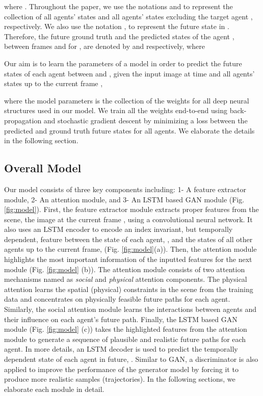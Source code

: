 \documentclass[10pt,twocolumn,letterpaper]{article}
\begin{document}
where . Throughout the paper, we use the notations  and  to represent the collection of all  agents' states and all agents' states excluding the target agent , respectively. We also use the notation , to represent the future state in . Therefore, the future ground truth and the predicted states of the agent , between frames  and  for , are denoted by  and  respectively, where 

Our aim is to learn the parameters of a model  in order to predict the future states of each agent between  and , given the input image at time  and all agents' states up to the current frame , \ie 

where the model parameters  is the collection of the weights for all deep neural structures used in our model. We train all the weights end-to-end using back-propagation and stochastic gradient descent by minimizing a loss  between the predicted and ground truth future states for all agents. We elaborate the details in the following section.


\subsection{Overall Model}
\label{sec:Overall_Model}
Our model consists of three key components including: 1- A feature extractor module, 2- An attention module, and 3- An LSTM based GAN module (Fig. \ref{fig:model}). First, the feature extractor module extracts proper features from the scene, \ie the image at the current frame , using a convolutional neural network. It also uses an LSTM encoder to encode an index invariant, but temporally dependent, feature between the state of each agent, , and the states of all other agents up to the current frame,  (Fig. \ref{fig:model}(a)). Then, the attention module highlights the most important information of the inputted features for the next module (Fig. \ref{fig:model} (b)). The attention module consists of two attention mechanisms named as \emph{social} and \emph{physical} attention components. The physical attention learns the spatial (physical) constraints in the scene from the training data and concentrates on physically feasible future paths for each agent. Similarly, the social attention module learns the interactions between agents and their influence on each agent's future path. Finally, the LSTM based GAN module (Fig. \ref{fig:model} (c)) takes the highlighted features from the attention module to generate a sequence of plausible and realistic future paths for each agent. In more details, an LSTM decoder is used to predict the temporally dependent state of each agent in future, \ie . Similar to GAN, a discriminator is also applied to improve the performance of the generator model by forcing it to produce more realistic samples (trajectories). In the following sections, we elaborate each module in detail.
\end{document}
